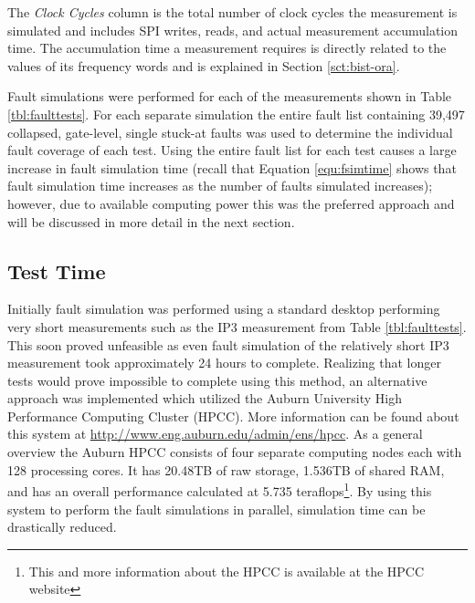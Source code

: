 \documentclass[12pt]{report}
\begin{document}
The \textit{Clock Cycles} column is the total number of clock cycles the measurement is simulated and includes SPI writes, reads, and actual measurement accumulation time.  The accumulation time a measurement requires is directly related to the values of its frequency words and is explained in Section \ref{sct:bist-ora}.

Fault simulations were performed for each of the measurements shown in Table \ref{tbl:faulttests}.  For each separate simulation the entire fault list containing 39,497 collapsed, gate-level, single stuck-at faults was used to determine the individual fault coverage of each test.  Using the entire fault list for each test causes a large increase in fault simulation time (recall that Equation \ref{equ:fsimtime} shows that fault simulation time increases as the number of faults simulated increases); however, due to available computing power this was the preferred approach and will be discussed in more detail in the next section.

\subsection{Test Time}
Initially fault simulation was performed using a standard desktop performing very short measurements such as the IP3 measurement from Table \ref{tbl:faulttests}.  This soon proved unfeasible as even fault simulation of the relatively short IP3 measurement took approximately 24 hours to complete.  Realizing that longer tests would prove impossible to complete using this method, an alternative approach was implemented which utilized the Auburn University High Performance Computing Cluster (HPCC).  More information can be found about this system at \url{http://www.eng.auburn.edu/admin/ens/hpcc}.  As a general overview the Auburn HPCC consists of four separate computing nodes each with 128 processing cores.  It has 20.48TB of raw storage, 1.536TB of shared RAM, and has an overall performance calculated at 5.735 teraflops\footnote{This and more information about the HPCC is available at the HPCC website}.  By using this system to perform the fault simulations in parallel, simulation time can be drastically reduced.
\end{document}
